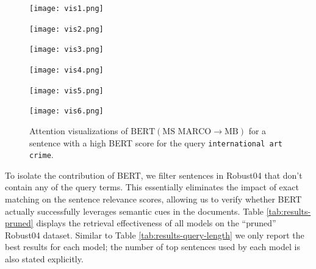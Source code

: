 \begin{figure}
	\centering
    \begin{minipage}{0.33\textwidth}
        \centering
        \texttt{[image: vis1.png]}
        \vspace{1cm}
    \end{minipage}\hfill
    \begin{minipage}{0.33\textwidth}
        \centering
        \texttt{[image: vis2.png]}
        \vspace{1cm}
    \end{minipage}\hfill
    \begin{minipage}{0.33\textwidth}
        \centering
        \texttt{[image: vis3.png]}
        \vspace{1cm}
    \end{minipage}
     \begin{minipage}{0.33\textwidth}
        \centering
        \texttt{[image: vis4.png]}
    \end{minipage}\hfill
    \begin{minipage}{0.33\textwidth}
        \centering
        \texttt{[image: vis5.png]}
    \end{minipage}\hfill
    \begin{minipage}{0.33\textwidth}
        \centering
        \texttt{[image: vis6.png]}
    \end{minipage}
\caption{Attention visualizations of $ \textrm{BERT} (\textrm{MS MARCO}\rightarrow\textrm{MB}) $ for a sentence with a high BERT score for the query \texttt{international art crime}.}
\label{fig:attention}
\end{figure}

To isolate the contribution of BERT, we filter sentences in Robust04 that don't contain any of the query terms.
This essentially eliminates the impact of exact matching on the sentence relevance scores, allowing us to verify whether BERT actually successfully leverages semantic cues in the documents.
Table \ref{tab:results-pruned} displays the retrieval effectiveness of all models on the ``pruned'' Robust04 dataset.
Similar to Table \ref{tab:results-query-length} we only report the best results for each model; the number of top sentences used by each model is also stated explicitly.

